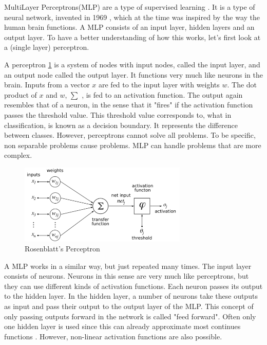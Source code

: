 MultiLayer Perceptrons(MLP) are a type of supervised learning \cite{michie1994machine}. It is a type of neural network, invented in 1969 \cite{minsky1969perceptions}, which at the time  was inspired by the way the human brain functions. A MLP consists of an input layer, hidden layers and an output layer. To have a better understanding of how this works, let's first look at a (single layer) perceptron\cite{rosenblatt1958perceptron}. 

A perceptron \ref{fig:perceptron} is a system of nodes with input nodes, called the input layer, and an output node called the output layer. It functions very much like neurons in the brain. Inputs from a vector $x$ are fed to the input layer with weights $w$. The dot product of $x$ and $w$, $\sum$ ,  is fed to an activation function. The output again resembles that of a neuron, in the sense that it "fires" if the activation function passes the threshold value. This threshold value corresponds to, what in classification, is known as a decision boundary. It represents the difference between classes. However, perceptrons cannot solve all problems. To be specific, non separable problems cause problems. MLP can handle problems that are more complex. \\
\begin{figure}[H]
    \includegraphics[width=80mm]{./img/perceptron.png}
    \caption{\footnotesize{Rosenblatt's Perceptron \cite{wikiPerceptronPNG}}}
    \label{fig:perceptron}
\end{figure}

A MLP works in a similar way, but just repeated many times. The input layer consists of neurons. Neurons in this sense are very much like perceptrons, but they can use different kinds of activation functions. Each neuron passes its output to the hidden layer. In the hidden layer, a number of neurons take these outputs as input and pass their output to the output layer of the MLP. This concept of only passing outputs forward in the network is called "feed forward". Often only one hidden layer is used since this can already approximate most continues functions \cite{cybenko1989approximation}. However, non-linear activation functions are also possible. 

